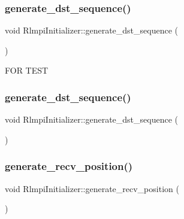 \subsubsection{\texorpdfstring{generate\_dst\_sequence()}{generate\_dst\_sequence()}\hspace{0.1cm}{\footnotesize\ttfamily [1/2]}}
{\footnotesize\ttfamily void Rlmpi\+Initializer\+::generate\+\_\+dst\+\_\+sequence (\begin{DoxyParamCaption}{ }\end{DoxyParamCaption})\hspace{0.3cm}{\ttfamily [protected]}}

F\+OR T\+E\+ST \mbox{\label{classRlmpiInitializer_a50e9169843eaa848e5bff8ec3859a990}} 
\subsubsection{\texorpdfstring{generate\_dst\_sequence()}{generate\_dst\_sequence()}\hspace{0.1cm}{\footnotesize\ttfamily [2/2]}}
{\footnotesize\ttfamily void Rlmpi\+Initializer\+::generate\+\_\+dst\+\_\+sequence (\begin{DoxyParamCaption}{ }\end{DoxyParamCaption})\hspace{0.3cm}{\ttfamily [protected]}}

\mbox{\label{classRlmpiInitializer_a6940fb6f728fcdb644d52787082b582f}} 
\subsubsection{\texorpdfstring{generate\_recv\_position()}{generate\_recv\_position()}\hspace{0.1cm}{\footnotesize\ttfamily [1/2]}}
{\footnotesize\ttfamily void Rlmpi\+Initializer\+::generate\+\_\+recv\+\_\+position (\begin{DoxyParamCaption}{ }\end{DoxyParamCaption})\hspace{0.3cm}{\ttfamily [protected]}}

